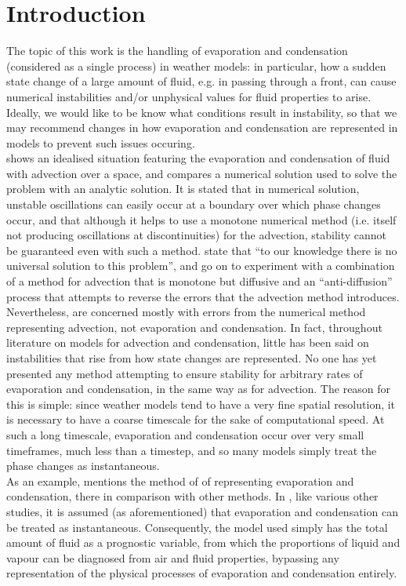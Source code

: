 \documentclass[11pt]{article}
\begin{document}
\section{Introduction}
The topic of this work is the handling of evaporation and condensation (considered as a single process) in weather models: in particular, how a sudden state change of a large amount of fluid, e.g. in passing through a front, can cause numerical instabilities and/or unphysical values for fluid properties to arise. Ideally, we would like to be know what conditions result in instability, so that we may recommend changes in how evaporation and condensation are represented in models to prevent such issues occuring. \\
\citet{GS1990} shows an idealised situation featuring the evaporation and condensation of fluid with advection over a space, and compares a numerical solution used to solve the problem with an analytic solution. It is stated that in numerical solution, unstable oscillations can easily occur at a boundary over which phase changes occur, and that although it helps to use a monotone numerical method (i.e. itself not producing oscillations at discontinuities) for the advection, stability cannot be guaranteed even with such a method. \citeauthor{GS1990} state that ``to our knowledge there is no universal solution to this problem'', and go on to experiment with a combination of a method for advection that is monotone but diffusive and an ``anti-diffusion'' process that attempts to reverse the errors that the advection method introduces. \\
Nevertheless, \citeauthor{GS1990} are concerned mostly with errors from the numerical method representing advection, not evaporation and condensation. In fact, throughout literature on models for advection and condensation, little has been said on instabilities that rise from how state changes are represented. No one has yet presented any method attempting to ensure stability for arbitrary rates of evaporation and condensation, in the same way as \citeauthor{GS1990} for advection. The reason for this is simple: since weather models tend to have a very fine spatial resolution, it is necessary to have a coarse timescale for the sake of computational speed. At such a long timescale, evaporation and condensation occur over very small timeframes, much less than a timestep, and so many models simply treat the phase changes as instantaneous. \\
As an example, \citet[p.~2095]{Wilson2008} mentions the method of \citet{Smith1990} of representing evaporation and condensation, there in comparison with other methods. In \citeauthor{Smith1990}, like various other studies, it is assumed (as aforementioned) that evaporation and condensation can be treated as instantaneous. Consequently, the model used simply has the total amount of fluid as a prognostic variable, from which the proportions of liquid and vapour can be diagnosed from air and fluid properties, bypassing any representation of the physical processes of evaporation and condensation entirely. \\
\end{document}
